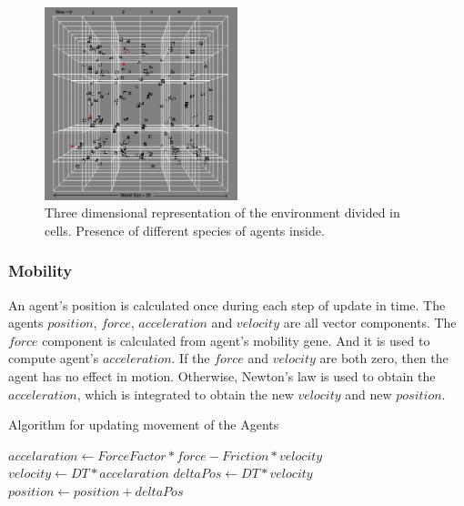 \documentclass[letterpaper]{article}
\numberwithin{equation}{section}
\begin{document}
\begin{figure}[h]
	\centering
	\includegraphics[width=0.5\textwidth]{../tex/images/cells-front}
	\caption[Three dimensional representation of the environment]{Three dimensional representation of the environment divided in cells. Presence of different species of agents inside.}
	\label{tab:3-d-environment-images}
\end{figure}

\subsubsection{Mobility}
An agent's position is calculated once during each step of update in time. The agents \(position\), \(force\), \(acceleration\) and \(velocity\) are all vector components. The \(force\) component is calculated from agent's mobility gene. And it is used to compute agent's \(acceleration\). If the \(force\) and \(velocity\) are both zero, then the agent has no effect in motion. Otherwise, Newton's law is used to obtain the \(acceleration\), which is integrated to obtain the new \(velocity\) and new \(position\).

\begin{algorithm}
	\caption{Algorithm for updating movement of the Agents}
	\label{algo:algorithm-movement-agents}
	\begin{algorithmic}
			\STATE $accelaration \gets ForceFactor * force - Friction * velocity$
			\STATE $velocity \gets DT*accelaration$ 
			\STATE $deltaPos \gets DT*velocity$
			\STATE $position \gets position + deltaPos$
		\ENDFOR
	\end{algorithmic}
\end{algorithm}
\end{document}
